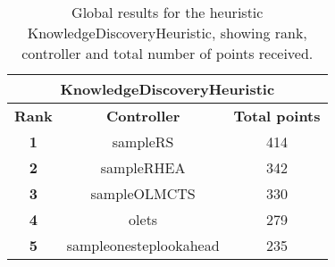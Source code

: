 \begin{table*}[!t]
\begin{center}
\begin{tabular}{|c|c|c|}
\multicolumn{3}{c}{\textbf{KnowledgeDiscoveryHeuristic}}\\
\hline
\textbf{Rank} & \textbf{Controller} & \textbf{Total points}\\
\hline
\textbf{1} & sampleRS & 414
 \\
\hline
\textbf{2} & sampleRHEA & 342
 \\
\hline
\textbf{3} & sampleOLMCTS & 330
 \\
\hline
\textbf{4} & olets & 279
 \\
\hline
\textbf{5} & sampleonesteplookahead & 235
 \\
\hline
\end{tabular}
\caption{Global results for the heuristic KnowledgeDiscoveryHeuristic, showing rank, controller and total number of points received.}
\label{tab:weights}
\end{center}
\end{table*}

